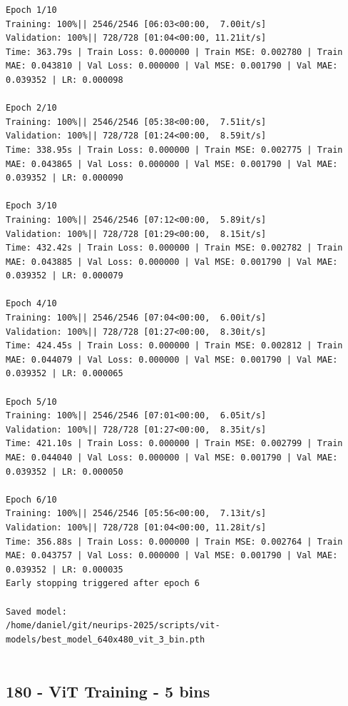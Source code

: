 \begin{verbatim}
Epoch 1/10
Training: 100%|| 2546/2546 [06:03<00:00,  7.00it/s]
Validation: 100%|| 728/728 [01:04<00:00, 11.21it/s]
Time: 363.79s | Train Loss: 0.000000 | Train MSE: 0.002780 | Train MAE: 0.043810 | Val Loss: 0.000000 | Val MSE: 0.001790 | Val MAE: 0.039352 | LR: 0.000098

Epoch 2/10
Training: 100%|| 2546/2546 [05:38<00:00,  7.51it/s]
Validation: 100%|| 728/728 [01:24<00:00,  8.59it/s]
Time: 338.95s | Train Loss: 0.000000 | Train MSE: 0.002775 | Train MAE: 0.043865 | Val Loss: 0.000000 | Val MSE: 0.001790 | Val MAE: 0.039352 | LR: 0.000090

Epoch 3/10
Training: 100%|| 2546/2546 [07:12<00:00,  5.89it/s]
Validation: 100%|| 728/728 [01:29<00:00,  8.15it/s]
Time: 432.42s | Train Loss: 0.000000 | Train MSE: 0.002782 | Train MAE: 0.043885 | Val Loss: 0.000000 | Val MSE: 0.001790 | Val MAE: 0.039352 | LR: 0.000079

Epoch 4/10
Training: 100%|| 2546/2546 [07:04<00:00,  6.00it/s]
Validation: 100%|| 728/728 [01:27<00:00,  8.30it/s]
Time: 424.45s | Train Loss: 0.000000 | Train MSE: 0.002812 | Train MAE: 0.044079 | Val Loss: 0.000000 | Val MSE: 0.001790 | Val MAE: 0.039352 | LR: 0.000065

Epoch 5/10
Training: 100%|| 2546/2546 [07:01<00:00,  6.05it/s]
Validation: 100%|| 728/728 [01:27<00:00,  8.35it/s]
Time: 421.10s | Train Loss: 0.000000 | Train MSE: 0.002799 | Train MAE: 0.044040 | Val Loss: 0.000000 | Val MSE: 0.001790 | Val MAE: 0.039352 | LR: 0.000050

Epoch 6/10
Training: 100%|| 2546/2546 [05:56<00:00,  7.13it/s]
Validation: 100%|| 728/728 [01:04<00:00, 11.28it/s]
Time: 356.88s | Train Loss: 0.000000 | Train MSE: 0.002764 | Train MAE: 0.043757 | Val Loss: 0.000000 | Val MSE: 0.001790 | Val MAE: 0.039352 | LR: 0.000035
Early stopping triggered after epoch 6

Saved model:
/home/daniel/git/neurips-2025/scripts/vit-models/best_model_640x480_vit_3_bin.pth


 \end{verbatim}
 
\subsection{180 - ViT Training - 5 bins}
\label{app_res:180}

